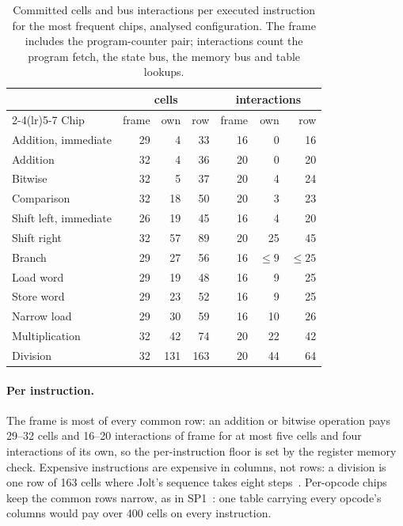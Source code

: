 \begin{table}[t]
\centering
\small
\caption{Committed cells and bus interactions per executed instruction for the most frequent chips, analysed configuration. The frame includes the program-counter pair; interactions count the program fetch, the state bus, the memory bus and table lookups.}
\label{tab:estimate}
\begin{tabular}{@{}lrrrrrr@{}}
\toprule
 & \multicolumn{3}{c}{cells} & \multicolumn{3}{c}{interactions} \\
\cmidrule(lr){2-4}\cmidrule(lr){5-7}
Chip & frame & own & row & frame & own & row \\
\midrule
Addition, immediate & 29 & 4 & 33 & 16 & 0 & 16 \\
Addition & 32 & 4 & 36 & 20 & 0 & 20 \\
Bitwise & 32 & 5 & 37 & 20 & 4 & 24 \\
Comparison & 32 & 18 & 50 & 20 & 3 & 23 \\
Shift left, immediate & 26 & 19 & 45 & 16 & 4 & 20 \\
Shift right & 32 & 57 & 89 & 20 & 25 & 45 \\
Branch & 29 & 27 & 56 & 16 & $\le 9$ & $\le 25$ \\
Load word & 29 & 19 & 48 & 16 & 9 & 25 \\
Store word & 29 & 23 & 52 & 16 & 9 & 25 \\
Narrow load & 29 & 30 & 59 & 16 & 10 & 26 \\
Multiplication & 32 & 42 & 74 & 20 & 22 & 42 \\
Division & 32 & 131 & 163 & 20 & 44 & 64 \\
\bottomrule
\end{tabular}
\end{table}

\paragraph{Per instruction.} The frame is most of every common row: an addition or bitwise operation pays 29--32 cells and 16--20 interactions of frame for at most five cells and four interactions of its own, so the per-instruction floor is set by the register memory check. Expensive instructions are expensive in columns, not rows: a division is one row of 163 cells where Jolt's sequence takes eight steps~\citep{jolt}. Per-opcode chips keep the common rows narrow, as in SP1~\citep{sp1}: one table carrying every opcode's columns would pay over 400 cells on every instruction.

